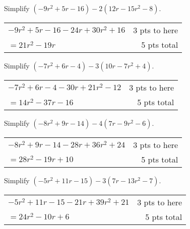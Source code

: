 {
	Simplify $(-9r^2+5r-16)-2(12r-15r^2-8)$.
}
{
	\begin{tabular}{l r}
	$-9r^2+5r-16-24r+30r^2+16$  & 3 pts to here\\
	$=21r^2-19r$ & 5 pts total\\
	\end{tabular}
}

{
	Simplify $(-7r^2+6r-4)-3(10r-7r^2+4)$.
}
{
	\begin{tabular}{l r}
	$-7r^2+6r-4-30r+21r^2-12$  & 3 pts to here\\
	$=14r^2-37r-16$ & 5 pts total\\
	\end{tabular}
}

{
	Simplify $(-8r^2+9r-14)-4(7r-9r^2-6)$.
}
{
	\begin{tabular}{l r}
	$-8r^2+9r-14-28r+36r^2+24$  & 3 pts to here\\
	$=28r^2-19r+10$ & 5 pts total\\
	\end{tabular}
}

{
	Simplify $(-5r^2+11r-15)-3(7r-13r^2-7)$.
}
{
	\begin{tabular}{l r}
	$-5r^2+11r-15-21r+39r^2+21$  & 3 pts to here\\
	$=24r^2-10r+6$ & 5 pts total\\
	\end{tabular}
}